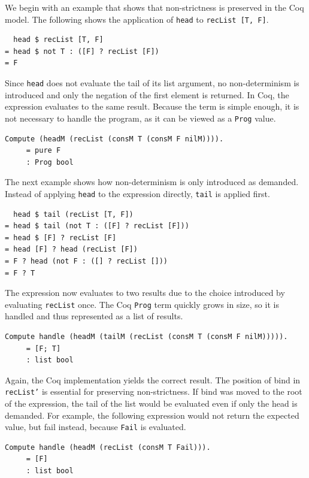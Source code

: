 \documentclass[a4paper, 11pt, fleqn, twoside]{scrreprt}
\newcommand{\hinl}[1]{\texttt{#1}}
\newcommand{\cinl}[1]{\texttt{#1}}
\begin{document}
We begin with an example that shows that non-strictness is preserved in the Coq model.
The following shows the application of \cinl{head} to \cinl{recList [T, F]}.

\begin{verbatim}
  head $ recList [T, F]
= head $ not T : ([F] ? recList [F])
= F
\end{verbatim}

Since \hinl{head} does not evaluate the tail of its list argument, no non-determinism is introduced and only the negation of the first element is returned.
In Coq, the expression evaluates to the same result.
Because the term is simple enough, it is not necessary to handle the program, as it can be viewed as a \cinl{Prog} value.

\begin{verbatim}
Compute (headM (recList (consM T (consM F nilM)))).
     = pure F
     : Prog bool
\end{verbatim}

The next example shows how non-determinism is only introduced as demanded.
Instead of applying \hinl{head} to the expression directly, \hinl{tail} is applied first.

\begin{verbatim}
  head $ tail (recList [T, F])
= head $ tail (not T : ([F] ? recList [F]))
= head $ [F] ? recList [F]
= head [F] ? head (recList [F])
= F ? head (not F : ([] ? recList []))
= F ? T
\end{verbatim}

The expression now evaluates to two results due to the choice introduced by evaluating \hinl{recList} once.
The Coq \cinl{Prog} term quickly grows in size, so it is handled and thus represented as a list of results.

\begin{verbatim}
Compute handle (headM (tailM (recList (consM T (consM F nilM))))).
     = [F; T]
     : list bool
\end{verbatim}

Again, the Coq implementation yields the correct result.
The position of bind in \cinl{recList'} is essential for preserving non-strictness.
If bind was moved to the root of the expression, the tail of the list would be evaluated even if only the head is demanded.
For example, the following expression would not return the expected value, but fail instead, because \cinl{Fail} is evaluated.

\begin{verbatim}
Compute handle (headM (recList (consM T Fail))).
     = [F]
     : list bool
\end{verbatim}
\end{document}

